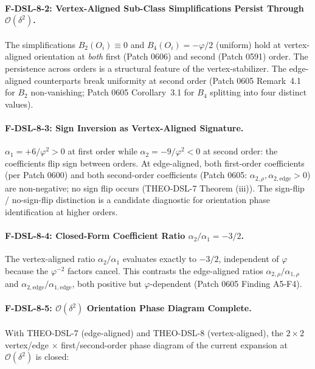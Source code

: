 \documentclass[11pt]{article}
\begin{document}
\paragraph{F-DSL-8-2: Vertex-Aligned Sub-Class Simplifications Persist Through $\mathcal{O}(\delta^2)$.}
The simplifications $B_2(O_i) \equiv 0$ and $B_4(O_i) = -\varphi/2$
(uniform) hold at vertex-aligned orientation at \emph{both} first
(Patch 0606) and second (Patch 0591) order. The persistence across
orders is a structural feature of the vertex-stabilizer. The
edge-aligned counterparts break uniformity at second order (Patch 0605
Remark~4.1 for $B_2$ non-vanishing; Patch 0605 Corollary~3.1 for $B_4$
splitting into four distinct values).

\paragraph{F-DSL-8-3: Sign Inversion as Vertex-Aligned Signature.}
$\alpha_1 = +6/\varphi^2 > 0$ at first order while
$\alpha_2 = -9/\varphi^2 < 0$ at second order: the coefficients flip
sign between orders. At edge-aligned, both first-order coefficients (per
Patch 0600) and both second-order coefficients (Patch 0605:
$\alpha_{2,\rho}, \alpha_{2,\text{edge}} > 0$) are non-negative; no sign
flip occurs (THEO-DSL-7 Theorem (iii)). The sign-flip / no-sign-flip
distinction is a candidate diagnostic for orientation phase
identification at higher orders.

\paragraph{F-DSL-8-4: Closed-Form Coefficient Ratio $\alpha_2/\alpha_1 = -3/2$.}
The vertex-aligned ratio $\alpha_2/\alpha_1$ evaluates exactly to $-3/2$,
independent of $\varphi$ because the $\varphi^{-2}$ factors cancel. This
contrasts the edge-aligned ratios
$\alpha_{2,\rho}/\alpha_{1,\rho}$ and
$\alpha_{2,\text{edge}}/\alpha_{1,\text{edge}}$, both positive but
$\varphi$-dependent (Patch 0605 Finding A5-F4).

\paragraph{F-DSL-8-5: $\mathcal{O}(\delta^2)$ Orientation Phase Diagram Complete.}
With THEO-DSL-7 (edge-aligned) and THEO-DSL-8 (vertex-aligned), the
$2 \times 2$ vertex/edge $\times$ first/second-order phase diagram of
the current expansion at $\mathcal{O}(\delta^2)$ is closed:
\end{document}
